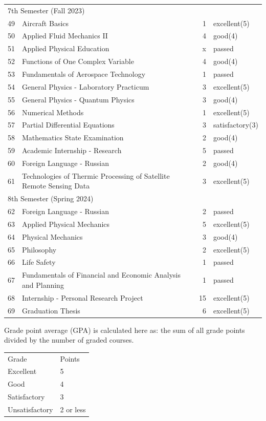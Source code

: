 \documentclass[a4paper, 11pt]{article}
\begin{document}
\begin{longtable}{p{} p{} r l}
\multicolumn{4}{l}{7th Semester (Fall 2023)} \\ 
49 & Aircraft Basics & 1 & excellent(5) \\
50 & Applied Fluid Mechanics II & 4 & good(4) \\
51 & Applied Physical Education & x & passed \\
52 & Functions of One Complex Variable & 4 & good(4) \\
53 & Fundamentals of Aerospace Technology & 1 & passed \\
54 & General Physics - Laboratory Practicum & 3 & excellent(5) \\
55 & General Physics - Quantum Physics & 3 & good(4) \\
56 & Numerical Methods & 1 & excellent(5) \\
57 & Partial Differential Equations & 3 & satisfactory(3) \\
58 & Mathematics State Examination & 2 & good(4) \\
59 & Academic Internship - Research & 5 & passed \\
60 & Foreign Language - Russian & 2 & good(4) \\
61 & Technologies of Thermic Processing of Satellite Remote Sensing Data & 3 & excellent(5) \\
\multicolumn{4}{l}{8th Semester (Spring 2024)} \\ 
62 & Foreign Language - Russian & 2 & passed \\
63 & Applied Physical Mechanics & 5 & excellent(5) \\
64 & Physical Mechanics & 3 & good(4) \\
65 & Philosophy & 2 & excellent(5) \\
66 & Life Safety & 1 & passed \\
67 & Fundamentals of Financial and Economic Analysis and Planning & 1 & passed \\
68 & Internship - Personal Research Project & 15 & excellent(5) \\
69 & Graduation Thesis & 6 & excellent(5) \\ \hline
\end{longtable}

Grade point average (GPA) is calculated here as: the sum of all grade points divided by the number of graded courses.

\begin{tabular}{l l}
Grade & Points \\
Excellent & 5 \\
Good & 4 \\
Satisfactory & 3 \\
Unsatisfactory & 2 or less \\
\end{tabular}
\end{document}
